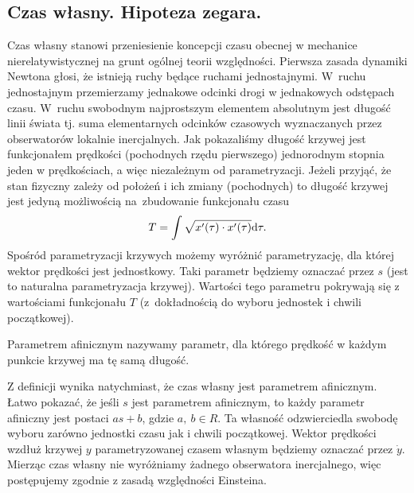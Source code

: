 \subsection{Czas własny. Hipoteza zegara.}
Czas własny stanowi przeniesienie
koncepcji czasu obecnej w mechanice nierelatywistycznej 
na grunt ogólnej teorii względności.
Pierwsza zasada dynamiki Newtona głosi, że istnieją ruchy będące ruchami
jednostajnymi.  W~ruchu jednostajnym przemierzamy 
jednakowe odcinki drogi w jednakowych odstępach czasu. 
W~ruchu swobodnym najprostszym elementem absolutnym jest 
długość linii świata tj. suma elementarnych 
odcinków czasowych wyznaczanych przez obserwatorów
lokalnie inercjalnych. Jak pokazaliśmy długość krzywej jest funkcjonałem 
prędkości (pochodnych rzędu pierwszego) jednorodnym stopnia jeden w 
prędkościach, a więc niezależnym od parametryzacji. 
Jeżeli przyjąć, że stan fizyczny zależy 
od położeń i ich zmiany (pochodnych) to długość krzywej jest 
jedyną możliwością na~zbudowanie funkcjonału czasu
\begin{align*}
T = \int \sqrt{x'(\tau) \cdot x'(\tau)} \text{d} \tau.
\end{align*}
Spośród parametryzacji krzywych 
 możemy wyróżnić parametryzację, 
dla której wektor prędkości jest 
jednostkowy. Taki parametr będziemy oznaczać przez $s$ 
(jest to naturalna parametryzacja krzywej). 
Wartości tego parametru pokrywają się z wartościami
 funkcjonału $T$
(z~dokładnością do wyboru jednostek i chwili początkowej). 
\begin{definition}
Parametrem afinicznym nazywamy parametr, dla którego 
prędkość w każdym punkcie krzywej ma tę samą długość.
\end{definition}
Z definicji wynika natychmiast, że czas własny jest parametrem afinicznym.
Łatwo pokazać, że jeśli $s$ jest 
parametrem afinicznym, to każdy parametr afiniczny 
jest postaci $a s+b$, gdzie $a,\ b\in R$. Ta własność odzwierciedla
swobodę wyboru zarówno jednostki czasu jak i chwili początkowej.
Wektor prędkości wzdłuż krzywej $y$ parametryzowanej czasem 
własnym będziemy oznaczać przez $\dot{y}$.
Mierząc czas własny nie wyróżniamy żadnego obserwatora inercjalnego,
 więc postępujemy zgodnie z zasadą względności Einsteina. 

